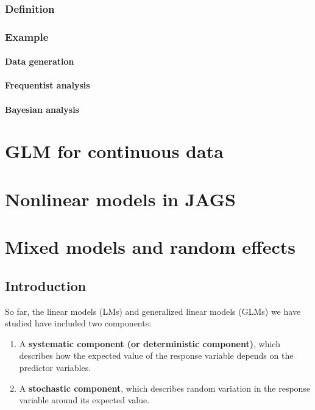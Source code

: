 \documentclass[
  13,
  letterpaper,
]{report}
\providecommand{\tightlist}{%
  \setlength{\itemsep}{0pt}\setlength{\parskip}{0pt}}
\begin{document}
\subsection{Definition}\label{sec-glm2-binom-def}

\subsection{Example}\label{sec-glm2-binom-ex}

\subsubsection{Data generation}\label{sec-glm2-binom-ex-sim}

\subsubsection{Frequentist analysis}\label{sec-glm2-binom-ex-freq}

\subsubsection{Bayesian analysis}\label{sec-glm2-binom-ex-bayes}

\chapter{GLM for continuous data}\label{sec-glm3}

\chapter{Nonlinear models in JAGS}\label{sec-non}

\chapter{Mixed models and random effects}\label{sec-mixed}

\section{Introduction}\label{sec-mixed-intro}

So far, the linear models (LMs) and generalized linear models (GLMs) we
have studied have included two components:

\begin{enumerate}
\def\labelenumi{\arabic{enumi}.}
\tightlist
\item
  A \textbf{systematic component (or deterministic component)}, which
  describes how the expected value of the response variable depends on
  the predictor variables.
\item
  A \textbf{stochastic component}, which describes random variation in
  the response variable around its expected value.
\end{enumerate}
\end{document}
